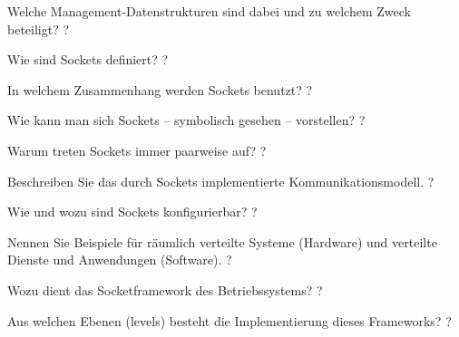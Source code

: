 \documentclass[avery5371]{flashcards}
\begin{document}
\begin{flashcard}[Dateisysteme]{Welche Management-Datenstrukturen sind dabei und zu welchem Zweck beteiligt?}
    ?
\end{flashcard}

\begin{flashcard}[Netzwerkmanagement]{Wie sind Sockets definiert?}
    ?
\end{flashcard}

\begin{flashcard}[Netzwerkmanagement]{In welchem Zusammenhang werden Sockets benutzt?}
    ?
\end{flashcard}

\begin{flashcard}[Netzwerkmanagement]{Wie kann man sich Sockets – symbolisch gesehen – vorstellen?}
    ?
\end{flashcard}

\begin{flashcard}[Netzwerkmanagement]{Warum treten Sockets immer paarweise auf?}
    ?
\end{flashcard}

\begin{flashcard}[Netzwerkmanagement]{Beschreiben Sie das durch Sockets implementierte Kommunikationsmodell. }
    ?
\end{flashcard}

\begin{flashcard}[Netzwerkmanagement]{Wie und wozu sind Sockets konfigurierbar? }
    ?
\end{flashcard}

\begin{flashcard}[Netzwerkmanagement]{Nennen Sie Beispiele für räumlich verteilte Systeme (Hardware) und verteilte Dienste und Anwendungen (Software).}
    ?
\end{flashcard}

\begin{flashcard}[Netzwerkmanagement]{Wozu dient das Socketframework des Betriebssystems?}
    ?
\end{flashcard}

\begin{flashcard}[Netzwerkmanagement]{Aus welchen Ebenen (levels) besteht die Implementierung dieses Frameworks?}
    ?
\end{flashcard}
\end{document}
